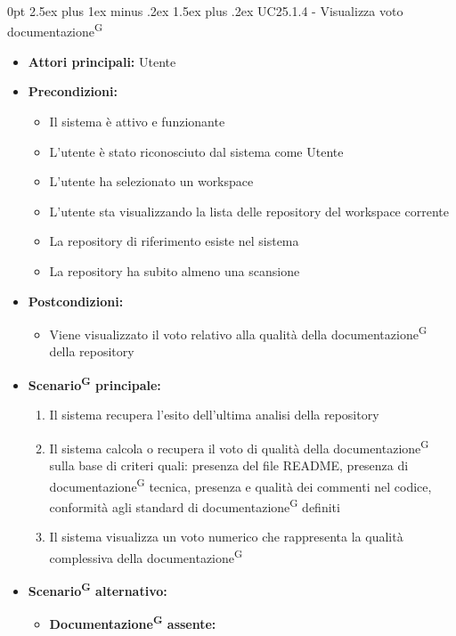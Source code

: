 \documentclass[a4paper, 11pt]{article}
\makeatletter
\renewcommand\paragraph{\@startsection{paragraph}{4}
  {0pt}
  {2.5ex plus 1ex minus .2ex}
  {1.5ex plus .2ex}
  {\normalfont\normalsize\bfseries\color{AccentDark}}}
\makeatother
\begin{document}
\paragraph{UC25.1.4 - Visualizza voto documentazione\textsuperscript{G}} \label{UC25.1.4}
\begin{itemize}
	\item \textbf{Attori principali:} Utente
	\item \textbf{Precondizioni:}
	\begin{itemize}
		\item Il sistema è attivo e funzionante
		\item L'utente è stato riconosciuto dal sistema come Utente
		\item L'utente ha selezionato un workspace
		\item L'utente sta visualizzando la lista delle repository del workspace corrente
		\item La repository di riferimento esiste nel sistema
		\item La repository ha subito almeno una scansione
	\end{itemize}
	\item \textbf{Postcondizioni:}
	\begin{itemize}
		\item Viene visualizzato il voto relativo alla qualità della documentazione\textsuperscript{G} della repository
	\end{itemize}
	\item \textbf{Scenario\textsuperscript{G} principale:}
	\begin{enumerate}
		\item Il sistema recupera l'esito dell'ultima analisi della repository
		\item Il sistema calcola o recupera il voto di qualità della documentazione\textsuperscript{G} sulla base di criteri quali: presenza del file README, presenza di documentazione\textsuperscript{G} tecnica, presenza e qualità dei commenti nel codice, conformità agli standard di documentazione\textsuperscript{G} definiti
		\item Il sistema visualizza un voto numerico che rappresenta la qualità complessiva della documentazione\textsuperscript{G}
	\end{enumerate}
	\item \textbf{Scenario\textsuperscript{G} alternativo:}
	\begin{itemize}
		\item \textbf{Documentazione\textsuperscript{G} assente:}
			\begin{itemize}

\end{itemize}
\end{itemize}
\end{itemize}
\end{document}
